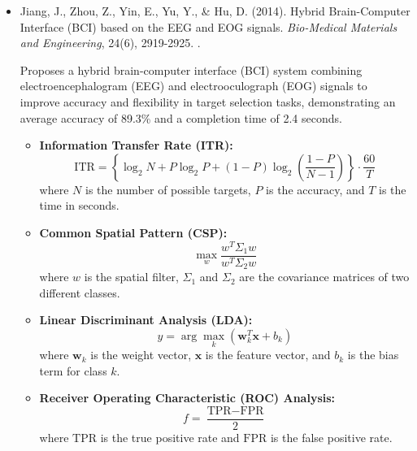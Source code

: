 \documentclass[10pt,svgnames,fragile]{beamer}
\begin{document}
\begin{frame}
\tiny
\begin{itemize}

    \item Jiang, J., Zhou, Z., Yin, E., Yu, Y., & Hu, D. (2014). Hybrid Brain-Computer Interface (BCI) based on the EEG and EOG signals. \textit{Bio-Medical Materials and Engineering}, 24(6), 2919-2925. \href{https://doi.org/10.3233/BME-141111}{\color{blue}{DOI: 10.3233/BME-141111}}. \cite{jiangHybridBrainComputerInterface2014}

    {\color{gray}Proposes a hybrid brain-computer interface (BCI) system combining electroencephalogram (EEG) and electrooculograph (EOG) signals to improve accuracy and flexibility in target selection tasks, demonstrating an average accuracy of 89.3\% and a completion time of 2.4 seconds.}
    \begin{itemize} \tiny
    \item \textbf{Information Transfer Rate (ITR):}
    \[
    \text{ITR} = \left\{ \log_2 N + P \log_2 P + (1 - P) \log_2 \left( \frac{1 - P}{N - 1} \right) \right\} \cdot \frac{60}{T}
    \]
    where \( N \) is the number of possible targets, \( P \) is the accuracy, and \( T \) is the time in seconds.

    \item \textbf{Common Spatial Pattern (CSP):}
    \[
    \max_w \frac{w^T \Sigma_1 w}{w^T \Sigma_2 w}
    \]
    where \( w \) is the spatial filter, \( \Sigma_1 \) and \( \Sigma_2 \) are the covariance matrices of two different classes.

    \item \textbf{Linear Discriminant Analysis (LDA):}
    \[
    y = \arg\max_k \left( \mathbf{w}_k^T \mathbf{x} + b_k \right)
    \]
    where \( \mathbf{w}_k \) is the weight vector, \( \mathbf{x} \) is the feature vector, and \( b_k \) is the bias term for class \( k \).

    \item \textbf{Receiver Operating Characteristic (ROC) Analysis:}
    \[
    f = \frac{\text{TPR} - \text{FPR}}{2}
    \]
    where \( \text{TPR} \) is the true positive rate and \( \text{FPR} \) is the false positive rate.
\end{itemize}

\end{itemize}
\end{frame}
\end{document}
